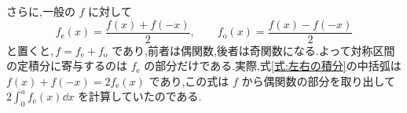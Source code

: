 さらに,一般の $f$ に対して
\[
f_{\mathrm e}(x)=\frac{f(x)+f(-x)}{2},\qquad
f_{\mathrm o}(x)=\frac{f(x)-f(-x)}{2}
\]
と置くと,\,$f=f_{\mathrm e}+f_{\mathrm o}$ であり,前者は偶関数,後者は奇関数になる.よって対称区間の定積分に寄与するのは $f_{\mathrm e}$ の部分だけである.実際,式\eqref{式:左右の積分}の中括弧は $f(x)+f(-x)=2f_{\mathrm e}(x)$ であり,この式は $f$ から偶関数の部分を取り出して $2\int_0^a f_{\mathrm e}(x)\dd x$ を計算していたのである.
